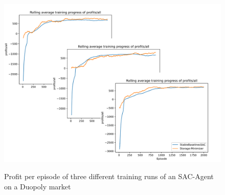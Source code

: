 \begin{figure}
	\centering
	\includegraphics[width = \textwidth]{images/experiments/SACDuopoly/SACDuopolyProfitsAll.pdf}\\[1 ex]
	\caption{Profit per episode of three different training runs of an SAC-Agent on a Duopoly market}\label{fig:SACDuopolyProfits}
\end{figure}